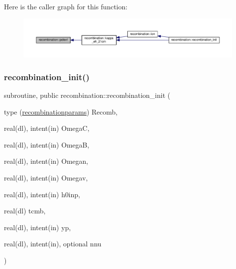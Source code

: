Here is the caller graph for this function\+:
\nopagebreak
\begin{figure}[H]
\begin{center}
\leavevmode
\includegraphics[width=350pt]{namespacerecombination_abd7e507e301ec237a76ea22d6a6be0eb_icgraph}
\end{center}
\end{figure}
\mbox{\label{namespacerecombination_ac2325c42e3b77187a31f6810929de147}} 
\subsubsection{\texorpdfstring{recombination\+\_\+init()}{recombination\_init()}}
{\footnotesize\ttfamily subroutine, public recombination\+::recombination\+\_\+init (\begin{DoxyParamCaption}\item[{type (\mbox{\hyperlink{structrecombination_1_1recombinationparams}{recombinationparams}})}]{Recomb,  }\item[{real(dl), intent(in)}]{OmegaC,  }\item[{real(dl), intent(in)}]{OmegaB,  }\item[{real(dl), intent(in)}]{Omegan,  }\item[{real(dl), intent(in)}]{Omegav,  }\item[{real(dl), intent(in)}]{h0inp,  }\item[{real(dl)}]{tcmb,  }\item[{real(dl), intent(in)}]{yp,  }\item[{real(dl), intent(in), optional}]{nnu }\end{DoxyParamCaption})}



